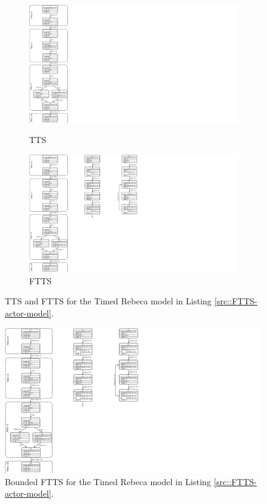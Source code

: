 \begin{figure}
\centering
\begin{subfigure}[b]{0.34\textwidth}
  \centering
  \small{
   \includegraphics[width=.8\textwidth]{resources/TTS.pdf}
  }
  \caption{TTS}
  \label{fig::TTS}
\end{subfigure}
\begin{subfigure}[b]{0.14\textwidth}
  \centering
  \small{
   \includegraphics[width=.8\textwidth]{resources/FTTS.pdf}
   \caption{FTTS}
   \label{fig::FTTS}
  }
\end{subfigure}
\caption{ TTS and FTTS for the Timed Rebeca model in Listing \ref{src::FTTS-actor-model}.}
\label{fig::FTTSandTTS}
\end{figure}

\begin{figure}
\centering
\includegraphics[width=.15\textwidth]{resources/BFTTS.pdf}
\caption{ Bounded FTTS for the Timed Rebeca model in Listing \ref{src::FTTS-actor-model}.}
\label{fig::BFTTS}
\end{figure}
